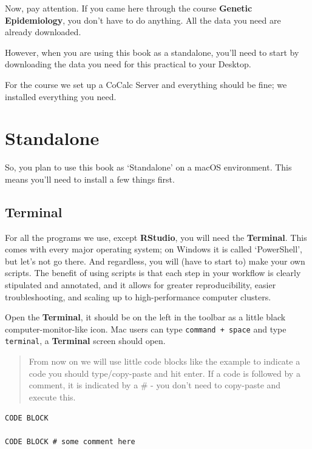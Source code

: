 \documentclass[
]{book}
\newcommand{\passthrough}[1]{#1}
\begin{document}
Now, pay attention. If you came here through the course \textbf{Genetic Epidemiology}, you don't have to do anything. All the data you need are already downloaded.

However, when you are using this book as a standalone, you'll need to start by downloading the data you need for this practical to your Desktop.

For the course we set up a CoCalc Server and everything should be fine; we installed everything you need.

\hypertarget{standalone}{%
\section{Standalone}\label{standalone}}

So, you plan to use this book as `Standalone' on a macOS environment. This means you'll need to install a few things first.

\hypertarget{terminal}{%
\subsection{Terminal}\label{terminal}}

For all the programs we use, except \textbf{RStudio}, you will need the \textbf{Terminal}. This comes with every major operating system; on Windows it is called `PowerShell', but let's not go there. And regardless, you will (have to start to) make your own scripts. The benefit of using scripts is that each step in your workflow is clearly stipulated and annotated, and it allows for greater reproducibility, easier troubleshooting, and scaling up to high-performance computer clusters.

Open the \textbf{Terminal}, it should be on the left in the toolbar as a little black computer-monitor-like icon. Mac users can type \passthrough{\lstinline!command + space!} and type \passthrough{\lstinline!terminal!}, a \textbf{Terminal} screen should open.

\begin{quote}
From now on we will use little code blocks like the example to indicate a code you should type/copy-paste and hit enter. If a code is followed by a comment, it is indicated by a \# - you don't need to copy-paste and execute this.
\end{quote}

\begin{lstlisting}
CODE BLOCK

CODE BLOCK # some comment here
\end{lstlisting}
\end{document}
